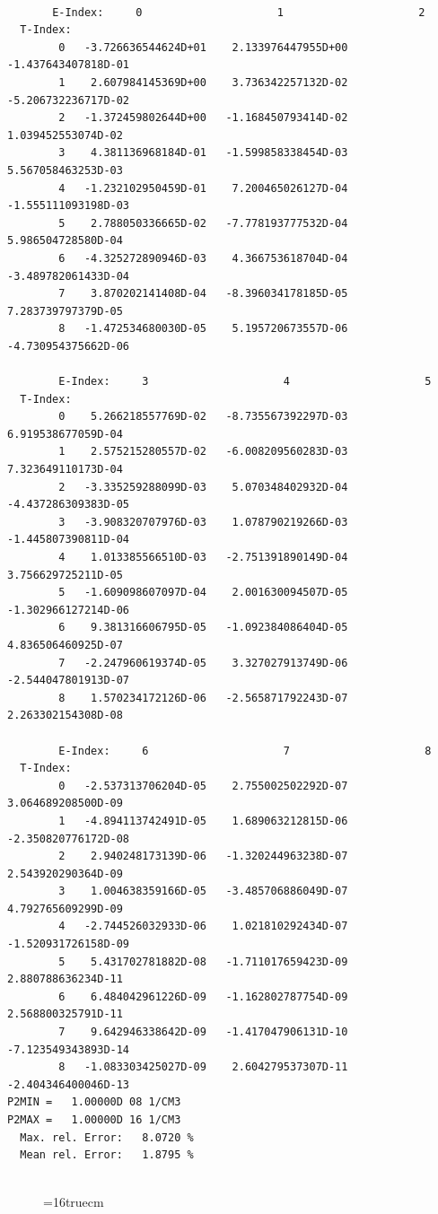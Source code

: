 \documentclass[12pt,dvipdfmx]{article}
\begin{document}
\begin{small}\begin{verbatim}

       E-Index:     0                     1                     2
  T-Index:
        0   -3.726636544624D+01    2.133976447955D+00   -1.437643407818D-01
        1    2.607984145369D+00    3.736342257132D-02   -5.206732236717D-02
        2   -1.372459802644D+00   -1.168450793414D-02    1.039452553074D-02
        3    4.381136968184D-01   -1.599858338454D-03    5.567058463253D-03
        4   -1.232102950459D-01    7.200465026127D-04   -1.555111093198D-03
        5    2.788050336665D-02   -7.778193777532D-04    5.986504728580D-04
        6   -4.325272890946D-03    4.366753618704D-04   -3.489782061433D-04
        7    3.870202141408D-04   -8.396034178185D-05    7.283739797379D-05
        8   -1.472534680030D-05    5.195720673557D-06   -4.730954375662D-06

        E-Index:     3                     4                     5
  T-Index:
        0    5.266218557769D-02   -8.735567392297D-03    6.919538677059D-04
        1    2.575215280557D-02   -6.008209560283D-03    7.323649110173D-04
        2   -3.335259288099D-03    5.070348402932D-04   -4.437286309383D-05
        3   -3.908320707976D-03    1.078790219266D-03   -1.445807390811D-04
        4    1.013385566510D-03   -2.751391890149D-04    3.756629725211D-05
        5   -1.609098607097D-04    2.001630094507D-05   -1.302966127214D-06
        6    9.381316606795D-05   -1.092384086404D-05    4.836506460925D-07
        7   -2.247960619374D-05    3.327027913749D-06   -2.544047801913D-07
        8    1.570234172126D-06   -2.565871792243D-07    2.263302154308D-08

        E-Index:     6                     7                     8
  T-Index:
        0   -2.537313706204D-05    2.755002502292D-07    3.064689208500D-09
        1   -4.894113742491D-05    1.689063212815D-06   -2.350820776172D-08
        2    2.940248173139D-06   -1.320244963238D-07    2.543920290364D-09
        3    1.004638359166D-05   -3.485706886049D-07    4.792765609299D-09
        4   -2.744526032933D-06    1.021810292434D-07   -1.520931726158D-09
        5    5.431702781882D-08   -1.711017659423D-09    2.880788636234D-11
        6    6.484042961226D-09   -1.162802787754D-09    2.568800325791D-11
        7    9.642946338642D-09   -1.417047906131D-10   -7.123549343893D-14
        8   -1.083303425027D-09    2.604279537307D-11   -2.404346400046D-13
P2MIN =   1.00000D 08 1/CM3
P2MAX =   1.00000D 16 1/CM3
  Max. rel. Error:   8.0720 %
  Mean rel. Error:   1.8795 %


\end{verbatim}\end{small}
\begin{figure} \label{2.2.15d}
\epsfxsize=16truecm
\end{figure}
\newpage
\end{document}
